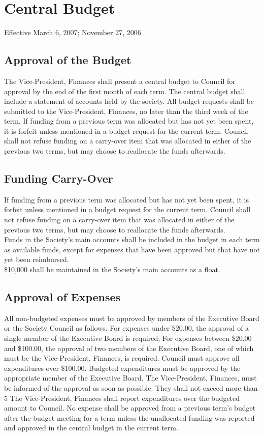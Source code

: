 \section{Central Budget}
Effective March 6, 2007; November 27, 2006

\subsection{Approval of the Budget}
The Vice-President, Finances shall present a central budget to Council for approval by the end of the first month of each term. The central budget shall include a statement of accounts held by the society.
All budget requests shall be submitted to the Vice-President, Finances, no later than the third week of the term.
If funding from a previous term was allocated but has not yet been spent, it is forfeit unless mentioned in a budget request for the current term. Council shall not refuse funding on a carry-over item that was allocated in either of the previous two terms, but may choose to reallocate the funds afterwards.

\subsection{Funding Carry-Over}
If funding from a previous term was allocated but has not yet been spent, it is forfeit unless mentioned in a budget request for the current term. Council shall not refuse funding on a carry-over item that was allocated in either of the previous two terms, but may choose to reallocate the funds afterwards.\\
Funds in the Society's main accounts shall be included in the budget in each term as available funds, except for expenses that have been approved but that have not yet been reimbursed.\\
\$10,000 shall be maintained in the Society's main accounts as a float.

\subsection{Approval of Expenses}
All non-budgeted expenses must be approved by members of the Executive Board or the Society Council as follows.
For expenses under \$20.00, the approval of a single member of the Executive Board is required;
For expenses between \$20.00 and \$100.00, the approval of two members of the Executive Board, one of which must be the Vice-President, Finances, is required.
Council must approve all expenditures over \$100.00.
Budgeted expenditures must be approved by the appropriate member of the Executive Board. The Vice-President, Finances, must be informed of the approval as soon as possible. They shall not exceed more than 5%
The Vice-President, Finances shall report expenditures over the budgeted amount to Council.
No expense shall be approved from a previous term's budget after the budget meeting for a term unless the unallocated funding was reported and approved in the central budget in the current term.

